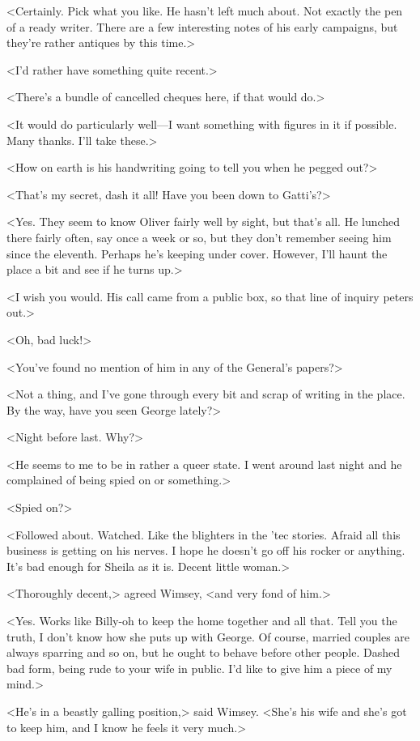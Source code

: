 <Certainly. Pick what you like. He hasn't left much about. Not exactly the pen of a ready writer. There are a few interesting notes of his early campaigns, but they're rather antiques by this time.>

<I'd rather have something quite recent.>

<There's a bundle of cancelled cheques here, if that would do.>

<It would do particularly well—I want something with figures in it if possible. Many thanks. I'll take these.>

<How on earth is his handwriting going to tell you when he pegged out?>

<That's my secret, dash it all! Have you been down to Gatti's?>

<Yes. They seem to know Oliver fairly well by sight, but that's all. He lunched there fairly often, say once a week or so, but they don't remember seeing him since the eleventh. Perhaps he's keeping under cover. However, I'll haunt the place a bit and see if he turns up.>

<I wish you would. His call came from a public box, so that line of inquiry peters out.>

<Oh, bad luck!>

<You've found no mention of him in any of the General's papers?>

<Not a thing, and I've gone through every bit and scrap of writing in the place. By the way, have you seen George lately?>

<Night before last. Why?>

<He seems to me to be in rather a queer state. I went around last night and he complained of being spied on or something.>

<Spied on?>

<Followed about. Watched. Like the blighters in the 'tec stories. Afraid all this business is getting on his nerves. I hope he doesn't go off his rocker or anything. It's bad enough for Sheila as it is. Decent little woman.>

<Thoroughly decent,> agreed Wimsey, <and very fond of him.>

<Yes. Works like Billy-oh to keep the home together and all that. Tell you the truth, I don't know how she puts up with George. Of course, married couples are always sparring and so on, but he ought to behave before other people. Dashed bad form, being rude to your wife in public. I'd like to give him a piece of my mind.>

<He's in a beastly galling position,> said Wimsey. <She's his wife and she's got to keep him, and I know he feels it very much.>

